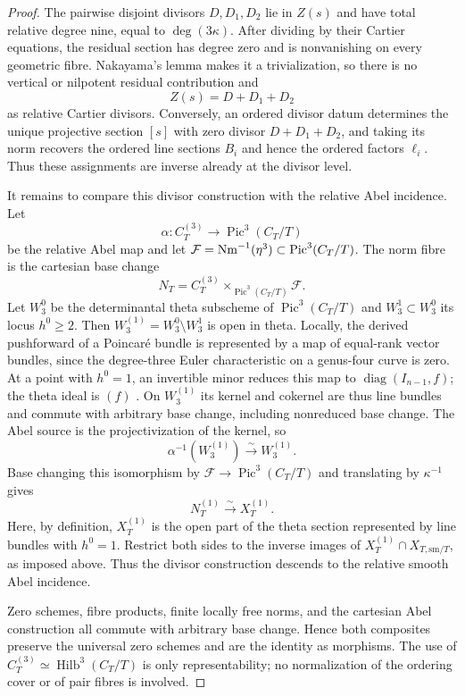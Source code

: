 \begin{proof}
The pairwise disjoint divisors $D,D_1,D_2$ lie in $Z(s)$ and have total
relative degree nine, equal to $\deg(3\kappa)$.  After dividing by their
Cartier equations, the residual section has degree zero and is nonvanishing
on every geometric fibre.  Nakayama's lemma makes it a trivialization, so
there is no vertical or nilpotent residual contribution and
\begin{equation}
 Z(s)=D+D_1+D_2
\label{eq:relative-zero-sum}
\end{equation}
as relative Cartier divisors.  Conversely, an ordered divisor datum
determines the unique projective section $[s]$ with zero divisor
$D+D_1+D_2$, and taking its norm recovers the ordered line sections $B_i$
and hence the ordered factors $\ell_i$.  Thus these assignments are inverse
already at the divisor level.

It remains to compare this divisor construction with the relative Abel
incidence.  Let
\[
 \alpha:C_T^{(3)}\longrightarrow\operatorname{Pic}^3(C_T/T)
\]
be the relative Abel map and let
$\mathcal F=\operatorname{Nm}^{-1}(\eta^3)\subset\operatorname{Pic}^3(C_T/T)$.  The norm fibre is
the cartesian base change
\[
 N_T=C_T^{(3)}\times_{\operatorname{Pic}^3(C_T/T)}\mathcal F.
\]
Let $W_3^0$ be the determinantal theta subscheme of
$\operatorname{Pic}^3(C_T/T)$ and $W_3^1\subset W_3^0$ its locus $h^0\ge2$.
Then $W_3^{(1)}=W_3^0\setminus W_3^1$ is open in theta.
Locally, the derived pushforward of a Poincar\'e bundle is represented by
a map of equal-rank vector bundles, since the degree-three Euler
characteristic on a genus-four curve is zero.  At a point with $h^0=1$,
an invertible minor reduces this map to
$\operatorname{diag}(I_{n-1},f)$; the theta ideal is $(f)$
\cite{Kempf1973}.  On $W_3^{(1)}$ its kernel and cokernel are thus line
bundles and commute with arbitrary base change, including nonreduced base
change.  The Abel source is the projectivization of the kernel, so
\[
 \alpha^{-1}(W_3^{(1)})\xrightarrow{\sim}W_3^{(1)}.
\]
Base changing this isomorphism by
$\mathcal F\to\operatorname{Pic}^3(C_T/T)$ and
translating by $\kappa^{-1}$ gives
\[
 N_T^{(1)}\xrightarrow{\sim}X_T^{(1)}.
\]
Here, by definition, $X_T^{(1)}$ is the open part of the theta section
represented by line bundles with $h^0=1$.
Restrict both sides to the inverse images of
$X_T^{(1)}\cap X_{T,\mathrm{sm}/T}$, as imposed above.  Thus the divisor
construction descends to the relative smooth Abel incidence.

Zero schemes, fibre products, finite locally free norms, and the cartesian
Abel construction all commute with arbitrary base change.  Hence both
composites preserve the universal zero schemes and are the identity as
morphisms.  The use of $C_T^{(3)}\simeq\operatorname{Hilb}^3(C_T/T)$ is only
representability; no normalization of the ordering cover or of pair fibres
is involved.
\end{proof}

